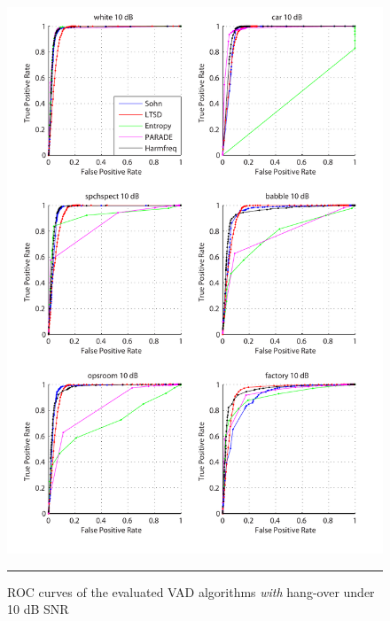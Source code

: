 \begin{figure}[htbp]
	\centering
		\includegraphics[width=1.0\columnwidth]{Figures/Chapter4/10dBh.pdf}
		\rule{37em}{0.5pt}
	\caption[ROC curves of the evaluated algorithms \emph{with} hang-over under 10 dB SNR]{ROC curves of the evaluated VAD algorithms \emph{with} hang-over under 10 dB SNR}
	\label{fig:10dBh}
\end{figure}

